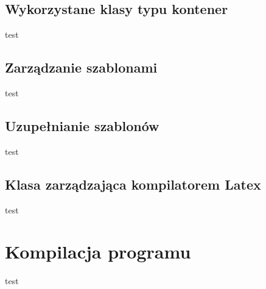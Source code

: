 \subsection{Wykorzystane klasy typu kontener}
test
\subsection{Zarządzanie szablonami}
test
\subsection{Uzupełnianie szablonów}
test
\subsection{Klasa zarządzająca kompilatorem Latex}
test
\section{ Kompilacja programu}
test